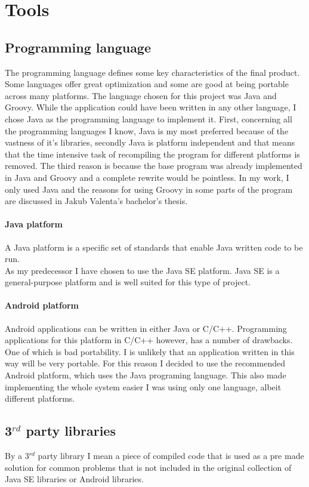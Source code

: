 \documentclass[11pt,twoside,a4paper]{book}
\begin{document}
\section{Tools}
\subsection{Programming language}
The programming language defines some key characteristics of the final product. Some languages offer great optimization and some are good at being portable across many platforms. The language chosen for this project was Java and Groovy\cite{whatIsGroovy}. While the application could have been written in any other language, I chose Java as the programming language to implement it. First, concerning all the programming languages I know, Java is my most preferred because of the vastness of it's libraries, secondly Java is platform independent and that means that the time intensive task of recompiling the program for different platforms is removed. The third reason is because the base program was already implemented in Java and Groovy and a complete rewrite would be pointless. In my work, I only used Java and the reasons for using Groovy in some parts of the program are discussed in Jakub Valenta's bachelor's thesis\cite{bakalarkaJV}.

\paragraph{Java platform}
A Java platform is a specific set of standards that enable Java written code to be run. \\
As my predecessor I have chosen to use the Java SE\cite{whatIsJavaSE} platform. Java SE is a general-purpose platform and is well suited for this type of project.

\paragraph{Android platform}
Android applications can be written in either Java or C/C++. Programming applications for this platform in C/C++ however, has a number of drawbacks. One of which is bad portability. I is unlikely that an application written in this way will be very portable. For this reason I decided to use the recommended Android platform, which uses the Java programing language. This also made implementing the whole system easier I was using only one language, albeit different platforms.

\subsection{3$^{rd}$ party libraries}
By a  3$^{rd}$ party library I mean a piece of compiled code that is used as a pre made solution for common problems that  is not included in the original collection of Java SE libraries or Android libraries.
\end{document}

